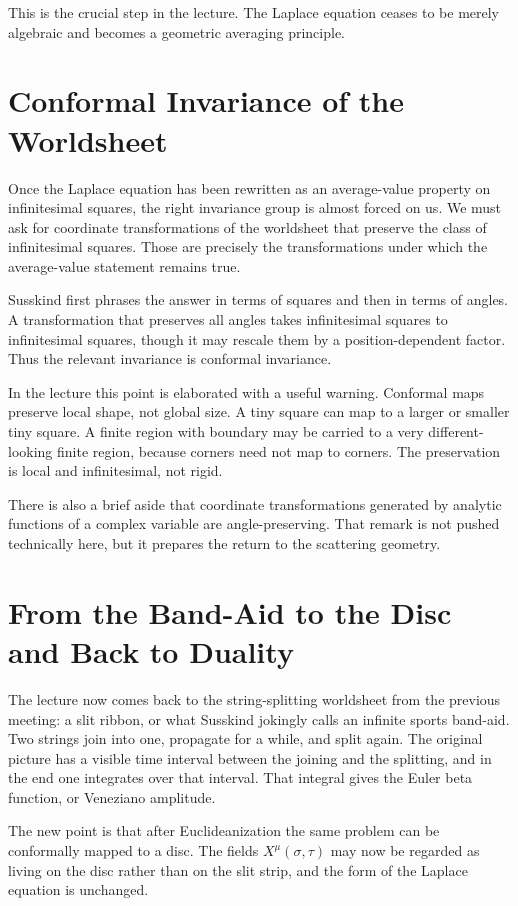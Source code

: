 This is the crucial step in the lecture. The Laplace equation ceases to be merely algebraic and becomes a geometric averaging principle.

\section{Conformal Invariance of the Worldsheet}

Once the Laplace equation has been rewritten as an average-value property on infinitesimal squares, the right invariance group is almost forced on us. We must ask for coordinate transformations of the worldsheet that preserve the class of infinitesimal squares. Those are precisely the transformations under which the average-value statement remains true.

Susskind first phrases the answer in terms of squares and then in terms of angles. A transformation that preserves all angles takes infinitesimal squares to infinitesimal squares, though it may rescale them by a position-dependent factor. Thus the relevant invariance is conformal invariance.

In the lecture this point is elaborated with a useful warning. Conformal maps preserve local shape, not global size. A tiny square can map to a larger or smaller tiny square. A finite region with boundary may be carried to a very different-looking finite region, because corners need not map to corners. The preservation is local and infinitesimal, not rigid.

There is also a brief aside that coordinate transformations generated by analytic functions of a complex variable are angle-preserving. That remark is not pushed technically here, but it prepares the return to the scattering geometry.

\section{From the Band-Aid to the Disc and Back to Duality}

The lecture now comes back to the string-splitting worldsheet from the previous meeting: a slit ribbon, or what Susskind jokingly calls an infinite sports band-aid. Two strings join into one, propagate for a while, and split again. The original picture has a visible time interval between the joining and the splitting, and in the end one integrates over that interval. That integral gives the Euler beta function, or Veneziano amplitude.

The new point is that after Euclideanization the same problem can be conformally mapped to a disc. The fields \(X^\mu(\sigma,\tau)\) may now be regarded as living on the disc rather than on the slit strip, and the form of the Laplace equation is unchanged.

